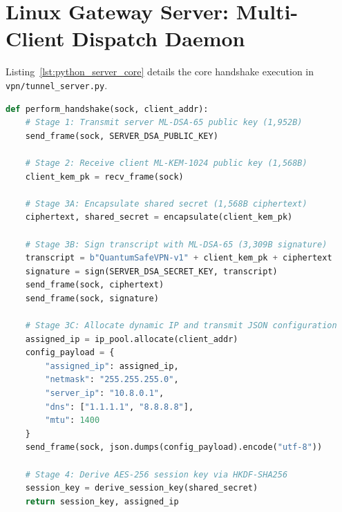 \section{Linux Gateway Server: Multi-Client Dispatch Daemon}

Listing~\ref{lst:python_server_core} details the core handshake execution in \texttt{vpn/tunnel\_server.py}.

\begin{lstlisting}[language=Python, basicstyle=\ttfamily\scriptsize, caption={Core Server Handshake Dispatch in tunnel\_server.py.}, label={lst:python_server_core}]
def perform_handshake(sock, client_addr):
    # Stage 1: Transmit server ML-DSA-65 public key (1,952B)
    send_frame(sock, SERVER_DSA_PUBLIC_KEY)

    # Stage 2: Receive client ML-KEM-1024 public key (1,568B)
    client_kem_pk = recv_frame(sock)

    # Stage 3A: Encapsulate shared secret (1,568B ciphertext)
    ciphertext, shared_secret = encapsulate(client_kem_pk)

    # Stage 3B: Sign transcript with ML-DSA-65 (3,309B signature)
    transcript = b"QuantumSafeVPN-v1" + client_kem_pk + ciphertext
    signature = sign(SERVER_DSA_SECRET_KEY, transcript)
    send_frame(sock, ciphertext)
    send_frame(sock, signature)

    # Stage 3C: Allocate dynamic IP and transmit JSON configuration
    assigned_ip = ip_pool.allocate(client_addr)
    config_payload = {
        "assigned_ip": assigned_ip,
        "netmask": "255.255.255.0",
        "server_ip": "10.8.0.1",
        "dns": ["1.1.1.1", "8.8.8.8"],
        "mtu": 1400
    }
    send_frame(sock, json.dumps(config_payload).encode("utf-8"))

    # Stage 4: Derive AES-256 session key via HKDF-SHA256
    session_key = derive_session_key(shared_secret)
    return session_key, assigned_ip
\end{lstlisting}
